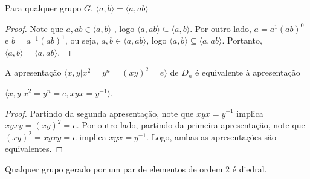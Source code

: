 	\par\vspace{0.3cm}
	
	\begin{lemma}
		\label{lema geradores}
		Para qualquer grupo $G$, $\langle a,b \rangle = \langle a,ab \rangle$
	\end{lemma}
	
	\begin{proof}
		Note que $a,ab\in\langle a,b \rangle$ , logo $\langle a,ab \rangle\subseteq \langle a,b \rangle$. Por outro lado, $a=a^1(ab)^0$ e $b=a^{-1}(ab)^1$, ou seja, $a,b\in\langle a,ab \rangle$, logo $\langle a,b \rangle \subseteq \langle a,ab \rangle$. Portanto, $\langle a,b \rangle = \langle a,ab \rangle$.
	\end{proof}
	
	\par\vspace{0.3cm}
	
	\begin{lemma}
		\label{lema diedral}
		A apresentação  $\langle x,y | x^2=y^n=(xy)^2=e \rangle$ de $D_n$ é equivalente à apresentação \par $\langle x,y | x^2=y^n=e,xyx=y^{-1} \rangle$.
	\end{lemma}
	
	\begin{proof}
		Partindo da segunda apresentação, note que $xyx=y^{-1}$ implica $xyxy=(xy)^2=e$. Por outro lado, partindo da primeira apresentação, note que $(xy)^2=xyxy=e$ implica $xyx=y^{-1}$. Logo, ambas as apresentações são equivalentes.
	\end{proof}
	
	\par\vspace{0.3cm}
	
	\begin{theorem}
		Qualquer grupo gerado por um par de elementos de ordem 2 é diedral. 
	\end{theorem}
	
